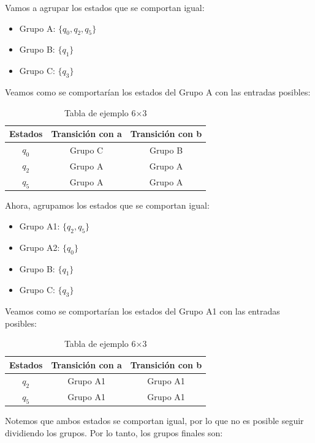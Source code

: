\begin{enumerate}
 Vamos a agrupar los estados que se comportan igual:
 \begin{itemize}
    \item Grupo A: $\{q_0, q_2, q_5\}$
    \item Grupo B: $\{q_1\}$
    \item Grupo C: $\{q_3\}$
 \end{itemize}
    Veamos como se comportarían los estados del Grupo A con las entradas posibles:      
    \begin{table}[ht]
    \centering      
    \begin{tabular}{|c|c|c|}
    \hline
    \textbf{Estados} & \textbf{Transición con a} & \textbf{Transición con b } \\
    \hline
    $q_0$ & Grupo C & Grupo B\\     
    \hline
    $q_2$  & Grupo A & Grupo A \\       
    \hline
    $q_5$ & Grupo A & Grupo A \\    
    \hline
    \end{tabular}       
    \caption{Tabla de ejemplo 6×3}
    \label{tab:ejemplo}
    \end{table} 
    Ahora, agrupamos los estados que se comportan igual:
    \begin{itemize}     
        \item Grupo A1: $\{q_2, q_5\}$
        \item Grupo A2: $\{q_0\}$
        \item Grupo B: $\{q_1\}$
        \item Grupo C: $\{q_3\}$
    \end{itemize}
    Veamos como se comportarían los estados del Grupo A1 con las entradas posibles:      
    \begin{table}[ht]        
    \centering      
    \begin{tabular}{|c|c|c|}        
    \hline
    \textbf{Estados} & \textbf{Transición con a} & \textbf{Transición con b } \\
    \hline
    $q_2$  & Grupo A1 & Grupo A1 \\ 
    \hline
    $q_5$ & Grupo A1 & Grupo A1 \\  
    \hline
    \end{tabular}       
    \caption{Tabla de ejemplo 6×3}
    \label{tab:ejemplo} 
    \end{table}
    Notemos que ambos estados se comportan igual, por lo que no es posible seguir dividiendo los grupos. Por lo tanto, los grupos finales son:
    \begin{itemize} 

\end{itemize}
\end{enumerate}
